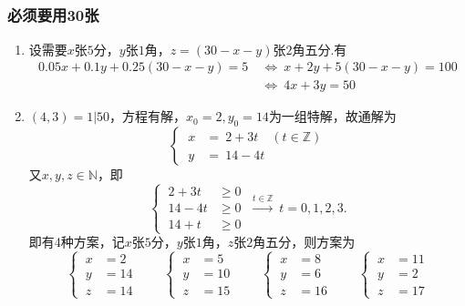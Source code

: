 \documentclass[UTF8]{ctexart}
\begin{document}
\subsection{}   %
\subsubsection{必须要用30张}
\begin{enumerate}
    \item []设需要$x$张$5$分，$y$张$1$角，$z=(30-x-y)$张$2$角五分.有
    \begin{align*}
        0.05 x + 0.1 y + 0.25 (30 - x - y) = 5\ 
        &\Leftrightarrow\ 
        x + 2 y + 5 (30 - x - y) = 100 \\
        &\Leftrightarrow\ 
        4x + 3y = 50
    \end{align*}
    \item []$(4,3)=1|50$，方程有解，$x_0=2,y_0=14$为一组特解，故通解为
    \[
        \begin{cases}
            \ x & =\  2 + 3t \quad (t\in \mathbb{Z})\\
            \ y & =\  14 - 4t
        \end{cases}
    \]
    又$x,y,z\in \mathbb{N}$，即
    \[
        \begin{cases}
            \ 2 + 3t  & \geq 0\\
            \ 14 - 4t & \geq 0\\
            \ 14 + t  & \geq 0
        \end{cases}
        \ \xrightarrow{t\in \mathbb{Z}}\ 
        t=0,1,2,3.
    \]
    即有4种方案，记$x$张$5$分，$y$张$1$角，$z$张$2$角五分，则方案为
    \[
        \begin{cases}
            \ x & = 2\\
            \ y & = 14\\
            \ z & = 14
        \end{cases}
        \qquad
        \begin{cases}
            \ x & = 5\\
            \ y & = 10\\
            \ z & = 15
        \end{cases}
        \qquad
        \begin{cases}
            \ x & = 8\\
            \ y & = 6\\
            \ z & = 16
        \end{cases}
        \qquad
        \begin{cases}
            \ x & = 11\\
            \ y & = 2\\
            \ z & = 17 
        \end{cases}
    \]
\end{enumerate}
\end{document}
